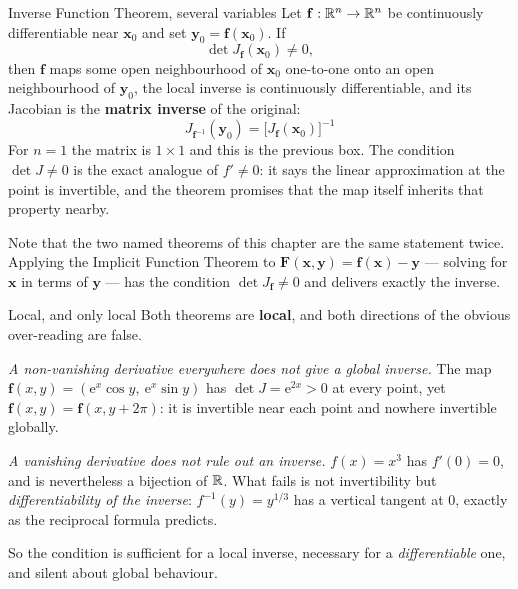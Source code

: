 \begin{rulebox}{Inverse Function Theorem, several variables}
Let $\mathbf{f}:\mathbb{R}^{n}\to\mathbb{R}^{n}$ be continuously differentiable near
$\mathbf{x}_{0}$ and set $\mathbf{y}_{0}=\mathbf{f}(\mathbf{x}_{0})$. If
\[
  \det J_{\mathbf{f}}(\mathbf{x}_{0})\neq0 ,
\]
then $\mathbf{f}$ maps some open neighbourhood of $\mathbf{x}_{0}$
one-to-one onto an open neighbourhood of $\mathbf{y}_{0}$, the local inverse
is continuously differentiable, and its Jacobian is the \textbf{matrix
inverse} of the original:
\[
  \boxed{\;J_{\mathbf{f}^{-1}}(\mathbf{y}_{0})
        =\bigl[J_{\mathbf{f}}(\mathbf{x}_{0})\bigr]^{-1}\;}
\]
For $n=1$ the matrix is $1\times1$ and this is the previous box.
The condition $\det J\neq0$ is the exact analogue of $f'\neq0$: it says the
linear approximation at the point is invertible, and the theorem promises
that the map itself inherits that property nearby.

Note that the two named theorems of this chapter are the same statement
twice. Applying the Implicit Function Theorem to
$\mathbf{F}(\mathbf{x},\mathbf{y})=\mathbf{f}(\mathbf{x})-\mathbf{y}$
--- solving for $\mathbf{x}$ in terms of $\mathbf{y}$ --- has the condition
$\det J_{\mathbf{f}}\neq0$ and delivers exactly the inverse.
\end{rulebox}

\begin{rulebox}{Local, and only local}
Both theorems are \textbf{local}, and both directions of the obvious
over-reading are false.

\emph{A non-vanishing derivative everywhere does not give a global
inverse.} The map
$\mathbf{f}(x,y)=(\mathrm{e}^{x}\cos y,\ \mathrm{e}^{x}\sin y)$ has
$\det J=\mathrm{e}^{2x}>0$ at every point, yet
$\mathbf{f}(x,y)=\mathbf{f}(x,y+2\pi)$: it is invertible near each point and
nowhere invertible globally.

\emph{A vanishing derivative does not rule out an inverse.} $f(x)=x^{3}$ has
$f'(0)=0$, and is nevertheless a bijection of $\mathbb{R}$. What fails is not
invertibility but \emph{differentiability of the inverse}: $f^{-1}(y)=
y^{1/3}$ has a vertical tangent at $0$, exactly as the reciprocal formula
predicts.

So the condition is sufficient for a local inverse, necessary for a
\emph{differentiable} one, and silent about global behaviour.
\end{rulebox}

